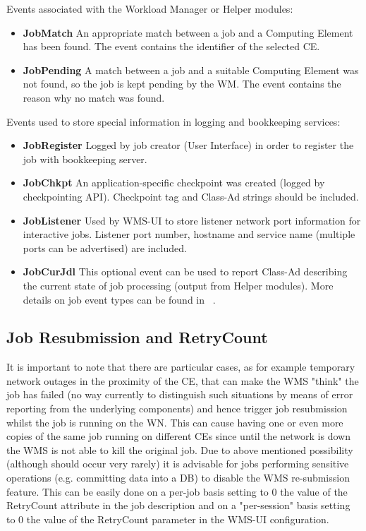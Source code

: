 Events associated with the Workload Manager or Helper modules:

\begin{itemize}
 	\item \textbf{JobMatch}	An appropriate match between a job and a Computing Element has been found. The event 
contains the identifier of the selected CE.
 	\item \textbf{JobPending}	A match between a job and a suitable Computing Element was not found, so the 
job is kept pending by the WM. The event contains the reason why no match was found.

\end{itemize}
\smallskip

Events used to store special information in logging and bookkeeping services:

\begin{itemize}
 	\item \textbf{JobRegister}	Logged by job creator (User Interface) in order to register the job with 
bookkeeping server.
 	\item \textbf{JobChkpt}	An application-specific checkpoint was created (logged by checkpointing API). Checkpoint 
tag and Class-Ad strings should be included.
 	\item \textbf{JobListener}	Used by WMS-UI to store listener network port information for interactive jobs. 
Listener port number, hostname and service name (multiple ports can be advertised) are included.
 	\item \textbf{JobCurJdl}	This optional event can be used to report Class-Ad describing the current state of 
job processing (output from Helper modules). More details on job event types can be found in ~\cite{lb}.
\end{itemize}

\medskip
\subsection{Job Resubmission and RetryCount}

It is important to note that there are particular cases, as for example temporary network outages in the proximity of 
the CE, that can make the WMS "think" the job has failed (no way currently to distinguish such situations by means of 
error reporting from the underlying components) and hence trigger job resubmission whilst the job is running on the WN. 
This can cause having one or even more copies of the same job running on different CEs since until the network is down 
the WMS is not able to kill the original job.
Due to above mentioned possibility (although should occur very rarely) it is advisable for jobs performing sensitive 
operations (e.g. committing data into a DB) to disable the WMS re-submission feature. This can be easily done on a per-job 
basis setting to 0 the value of the RetryCount attribute in the job description and on a "per-session" basis setting to 0 
the value of the RetryCount parameter in the WMS-UI configuration.



